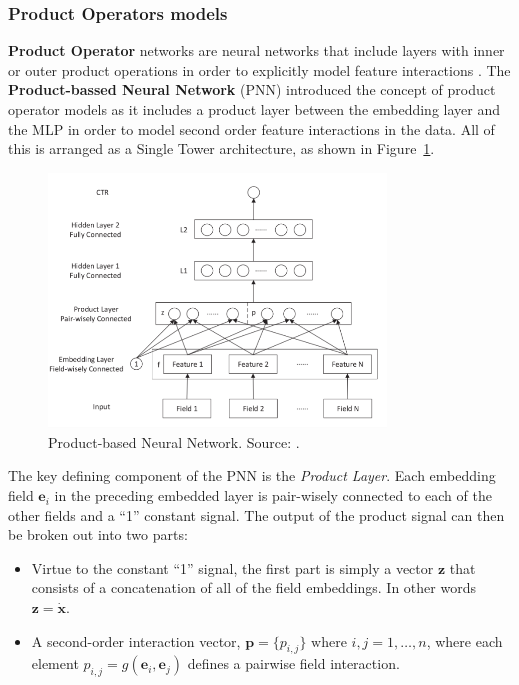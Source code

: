 \documentclass{mldsmsc}
\begin{document}
\subsubsection{Product Operators models}

\textbf{Product Operator} networks are neural networks that include layers with inner or outer
product operations in order to explicitly model feature interactions \citep{RefWorks:zhang2021deep}.
The \textbf{Product-bassed Neural Network} (PNN) introduced the concept of product operator models
as it includes a product layer between the embedding layer and the MLP in order to model second
order feature interactions in the data. All of this is arranged as a Single Tower architecture, as shown
in Figure~\ref{fig:pnn}.

\begin{figure}[h]
    \centering
    \includegraphics[width=0.8\textwidth]{../figures/pnn.png}
    \caption{Product-based Neural Network. Source: \citep{RefWorks:qu2016product-based}.}
    \label{fig:pnn}
\end{figure}

The key defining component of the PNN is the \emph{Product Layer}. Each embedding field $\mathbf{e}_i$
in the preceding embedded layer is pair-wisely connected to each of the other fields and a ``1''
constant signal. The output of the product signal can then be broken out into two parts:

\begin{itemize}
    \item Virtue to the constant ``1'' signal, the first part is simply a vector $\mathbf{z}$ that consists of a concatenation
    of all of the field embeddings. In other words $\mathbf{z} = \dot{\mathbf{x}}$.
    \item A second-order interaction vector, $\mathbf{p} = \{p_{i,j}\}\text{ where } i,j = 1, \ldots, n$, where each element
    $p_{i,j} = g(\mathbf{e}_i, \mathbf{e}_j)$ defines a pairwise field interaction.
\end{itemize}
\end{document}
